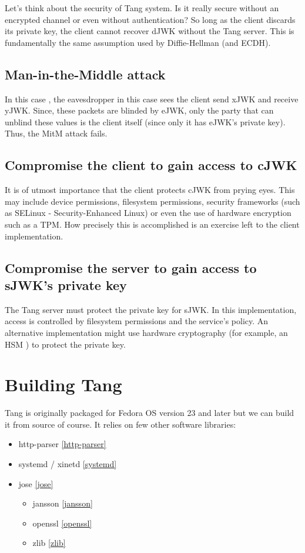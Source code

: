 \documentclass[../xdudla00-porting-Tang-to-Open-WRT.tex]{subfiles}
\begin{document}
Let's think about the security of Tang system. Is it really secure without an encrypted channel or even without authentication?
So long as the client discards its private key, the client cannot recover dJWK without the Tang server.
This is fundamentally the same assumption used by Diffie-Hellman (and ECDH)\cite{ecdh}.

\subsection{Man-in-the-Middle attack}
In this case \cite{mitm}, the eavesdropper in this case sees the client send xJWK and receive yJWK.
Since, these packets are blinded by eJWK, only the party that can unblind these values is the client itself (since only it has eJWK's private key).
Thus, the MitM attack fails.
\subsection{Compromise the client to gain access to cJWK}
It is of utmost importance that the client protects cJWK from prying eyes.
This may include device permissions, filesystem permissions, security frameworks (such as SELinux \cite{selinux}- Security-Enhanced Linux) or even the use of hardware encryption such as a TPM.
How precisely this is accomplished is an exercise left to the client implementation.
\subsection{Compromise the server to gain access to sJWK's private key}
The Tang server must protect the private key for sJWK.
In this implementation, access is controlled by filesystem permissions and the service's policy.
An alternative implementation might use hardware cryptography (for example, an HSM \cite{hsm}) to protect the private key.
\section{Building Tang}

Tang is originally packaged for Fedora OS\cite{fedora} version 23 and later but we can build it from source of course.
It relies on few other software libraries:

\begin{itemize}
\item http-parser \ref{http-parser}
\item systemd / xinetd \ref{systemd}
\item jose \ref{jose}
    \begin{itemize}
    \item jansson \ref{jansson}
    \item openssl \ref{openssl}
    \item zlib \ref{zlib}
    \end{itemize}
\end{itemize}
\end{document}
